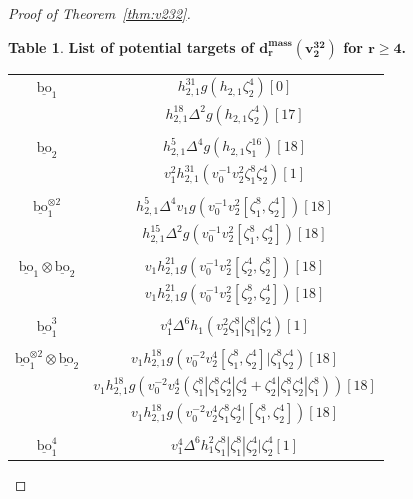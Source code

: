 \documentclass[10pt]{amsart}
\newcommand{\ul}[1]{\underline{#1}}
\newcommand{\bo}{\mathrm{bo}}
\newcommand{\bou}{\ul{\bo}}
\theoremstyle{definition}
\newtheorem{tab}[equation]{Table}
\numberwithin{equation}{section}
\numberwithin{figure}{section}
\begin{document}
\begin{proof}[Proof of Theorem~\ref{thm:v232}]
\begin{minipage}{\textwidth}
\begin{tab}\label{tab:v232targets}
{\bf List of potential targets of $\pmb{d^{mass}_r(v_2^{32})}$ for $\pmb{r \ge 4}$.} 
\end{tab}
\begin{center}
\begin{tabular}{c|c}
\hline
${\bou_1}$ & $h_{2,1}^{31}g(h_{2,1}\zeta_2^4)[0]$ \\
& $h_{2,1}^{18} \Delta^2 g(h_{2,1}\zeta_2^4)[17]$ \\
& \\
$\bou_2$ 
& $h^5_{2,1}\Delta^{4}g(h_{2,1}\zeta_1^{16})[18]$ \\
& $v_1^2 h_{2,1}^{31}(v_0^{-1}v_2^2\zeta_1^8\zeta_2^4)[1]$ \\
& \\
$\bou^{\otimes 2}_1$
& $h^5_{2,1}\Delta^4 v_1 g(v_0^{-1}v_2^2[\zeta_1^8,\zeta_2^4])[18]$ \\
& $h_{2,1}^{15}\Delta^2 g(v_0^{-1}v_2^2[\zeta_1^8,\zeta_2^4])[18]$ \\
& \\
$\bou_1 \otimes \bou_2$ & $v_1 h^{21}_{2,1} g(v_0^{-1}v_2^2 [\zeta_2^4,\zeta_2^{8}])[18]$ \\
& $v_1 h^{21}_{2,1} g(v_0^{-1}v_2^2 [\zeta_2^8,\zeta_2^{4}])[18]$ \\
& \\
$\bou_1^3$ 
& $v_1^4 \Delta^6 h_1 (v_2^2 \zeta_1^8|\zeta_1^8|\zeta_2^4)[1]$ \\
& \\
$\bou_1^{\otimes 2} \otimes \bou_2$
& $v_1 h_{2,1}^{18} g(v_0^{-2}v_2^4[\zeta_1^8,\zeta_2^4]|\zeta_1^8\zeta_2^4)[18]$ \\
& $v_1 h_{2,1}^{18} g(v_0^{-2}v_2^4(\zeta_1^8|\zeta_1^8\zeta_2^4|\zeta_2^4+\zeta_2^4|\zeta_1^8\zeta_2^4|\zeta_1^8))[18]$ \\
& $v_1 h_{2,1}^{18} g(v_0^{-2}v_2^4\zeta_1^8\zeta_2^4|[\zeta_1^8,\zeta_2^4])[18]$ \\
& \\
$\bou_1^4$ 
& $v_1^4 \Delta^6 h_1^2 \zeta_1^8|\zeta_1^8|\zeta_2^4|\zeta_2^4[1]$ \\
\hline
\end{tabular}   
\end{center}
\end{minipage}


\end{proof}
\end{document}
